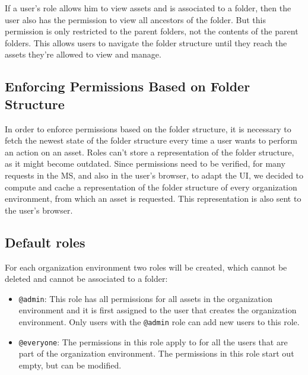 
If a user's role allows him to view assets and is associated to a folder, then the user
also has the permission to view all ancestors of the folder.
But this permission is only restricted to the parent folders, not the contents of the parent folders.
This allows users to navigate the folder structure until they reach the assets they're
allowed to view and manage.


\subsection{Enforcing Permissions Based on Folder Structure}

In order to enforce permissions based on the folder structure, it is necessary to fetch
the newest state of the folder structure every time a user wants to perform an action on an asset.
Roles can't store a representation of the folder structure, as it might become outdated.
Since permissions need to be verified, for many requests in the MS, and also in the user's browser, to
adapt the UI, we decided to compute and cache a representation of the folder structure of
every organization environment, from which an asset is requested.
This representation is also sent to the user's browser.


\subsection{Default roles}

For each organization environment two roles will be created, which cannot be deleted and
cannot be associated to a folder:

\begin{itemize}
  \item \lstinline{@admin}: This role has all permissions for all assets in the
    organization environment and it is first assigned to the user that creates the organization environment.
    Only users with the \lstinline{@admin} role can add new users to this role.
  \item \lstinline{@everyone}: The permissions in this role apply to for all the users
    that are part of the organization environment. The permissions in this role start out
    empty, but can be modified.
\end{itemize}

